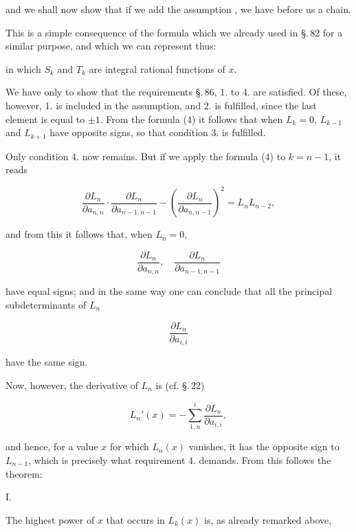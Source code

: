and we shall now show that if we add the assumption , we have before us a  chain.

This is a simple consequence of the formula which we already used in \S.\,82 for a similar purpose, and which we can represent thus:


in which $S_k$ and $T_k$ are integral rational functions of $x$.

We have only to show that the requirements \S.\,86, 1. to 4. are satisfied. Of these, however, 1. is included in the assumption, and 2. is fulfilled, since the last element is equal to $\pm 1$. From the formula (4) it follows that when $L_k=0$, $L_{k-1}$ and $L_{k+1}$ have opposite signs, so that condition 3. is fulfilled.

Only condition 4. now remains. But if we apply the formula (4) to $k=n-1$, it reads

\[
\frac{\partial L_n}{\partial a_{n,n}} \cdot \frac{\partial L_n}{\partial a_{n-1,n-1}} - \left(\frac{\partial L_n}{\partial a_{n,n-1}}\right)^2 = L_n L_{n-2},
\]

and from this it follows that, when $L_n=0$,

\[
\frac{\partial L_n}{\partial a_{n,n}}, \quad \frac{\partial L_n}{\partial a_{n-1,n-1}}
\]

have equal signs; and in the same way one can conclude that all the principal subdeterminants of $L_n$

\[
\frac{\partial L_n}{\partial a_{i,i}}
\]

have the same sign.

Now, however, the derivative of $L_n$ is (cf. \S.\,22)

\[
L_n'(x) = -\sum_{1,n}^{i} \frac{\partial L_n}{\partial a_{i,i}},
\]

and hence, for a value $x$ for which $L_n(x)$ vanishes, it has the opposite sign to $L_{n-1}$, which is precisely what requirement 4. demands. From this follows the theorem:

I.\ 

The highest power of $x$ that occurs in $L_k(x)$ is, as already remarked above,
